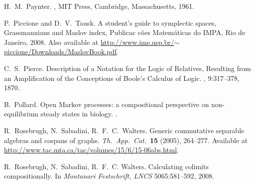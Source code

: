 \begin{thebibliography}{RSW00}

    H.\ M.\ Paynter.
    , MIT Press, Cambridge, Massachusetts, 1961.


    P.\ Piccione and D.\ V.\ Tausk.
    \newblock A student's guide to symplectic
    spaces, Grassmannians and Maslov index, Publicac c\~oes Matem\'aticas do
    IMPA, Rio de Janeiro, 2008.
    \newblock Also available at
    \href{http://www.ime.usp.br/~piccione/Downloads/MaslovBook.pdf}
    {http://www.ime.usp.br/$\sim$piccione/Downloads/MaslovBook.pdf}.

    C.\ S.\ Pierce.
    \newblock Description of a Notation for the Logic of Relatives, Resulting
    from an Amplification of the Conceptions of Boole's Calculus of Logic.
    ,
    9:317--378, 1870. 


    B.\ Pollard.
    \newblock Open Markov processes: a compositional
    perspective on non-equilibrium steady states in biology.
    .

    R.\ Rosebrugh, N.\ Sabadini, R.\ F.\ C.\ Walters.
    \newblock Generic
    commutative separable algebras and cospans of graphs.
    \newblock \textsl{Th.\ App.\
    Cat.\ }\textbf{15} (2005), 264--277.
    \newblock Available at
    \href{http://www.tac.mta.ca/tac/volumes/15/6/15-06abs.html}{http://www.tac.mta.ca/tac/volumes/15/6/15-06abs.html}.

    R.\ Rosebrugh, N.\ Sabadini, R.\ F.\ C. Walters.
    \newblock Calculating colimits compositionally.
    \newblock In \emph{Montanari Festschrift, LNCS} { 5065}:581--592, 2008.


\end{thebibliography}

